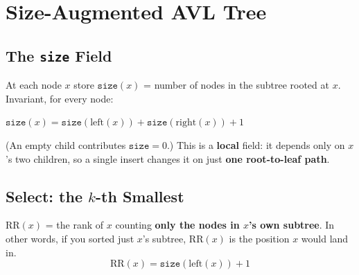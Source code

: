 \documentclass[11pt]{article}
\begin{document}
\section{Size-Augmented AVL Tree}

\subsection{The \texttt{size} Field}

\begin{defbox}
At each node $x$ store $\texttt{size}(x)$ = number of nodes in the subtree rooted at $x$. Invariant, for every node:
\begin{center}\large
$\texttt{size}(x) = \texttt{size}(\text{left}(x)) + \texttt{size}(\text{right}(x)) + 1$
\end{center}
(An empty child contributes $\texttt{size}=0$.) This is a \textbf{local} field: it depends only on $x$'s two children, so a single insert changes it on just \textbf{one root-to-leaf path}.
\end{defbox}

\begin{center}
\end{center}

\subsection{Select: the $k$-th Smallest}

\begin{defbox}
$\text{RR}(x)$ = the rank of $x$ counting \textbf{only the nodes in $x$'s own subtree}. In other words, if you sorted just $x$'s subtree, $\text{RR}(x)$ is the position $x$ would land in.
$$\text{RR}(x) = \texttt{size}(\text{left}(x)) + 1$$
\end{defbox}
\end{document}

